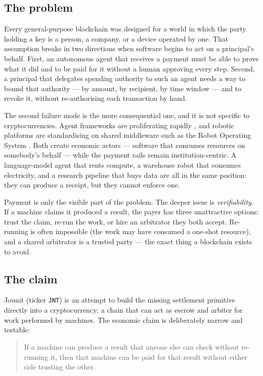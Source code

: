 \documentclass{article}
\begin{document}
\subsection{The problem}

Every general-purpose blockchain was designed for a world in which the party
holding a key is a person, a company, or a device operated by one. That
assumption breaks in two directions when software begins to act on a principal's
behalf. First, an autonomous agent that receives a payment must be able to prove
what it did and to be paid for it without a human approving every step. Second,
a principal that delegates spending authority to such an agent needs a way to
bound that authority --- by amount, by recipient, by time window --- and to
revoke it, without re-authorising each transaction by hand.

The second failure mode is the more consequential one, and it is not specific to
cryptocurrencies. Agent frameworks are proliferating rapidly \cite{sutton2019bitter,
yao2023survey,wang2023autogpt,yang2024sweagent}, and robotic platforms are
standardising on shared middleware such as the Robot Operating System
\cite{quan2021ros}. Both create economic actors --- software that consumes
resources on somebody's behalf --- while the payment rails remain
institution-centric. A language-model agent that rents compute, a warehouse
robot that consumes electricity, and a research pipeline that buys data are all
in the same position: they can produce a receipt, but they cannot enforce one.

Payment is only the visible part of the problem. The deeper issue is
\emph{verifiability}. If a machine claims it produced a result, the payer has
three unattractive options: trust the claim, re-run the work, or hire an
arbitrator they both accept. Re-running is often impossible (the work may have
consumed a one-shot resource), and a shared arbitrator is a trusted party --- the
exact thing a blockchain exists to avoid.

\subsection{The claim}

Jounit (ticker \texttt{JNT}) is an attempt to build the missing settlement
primitive directly into a cryptocurrency: a chain that can act as escrow and
arbiter for work performed by machines. The economic claim is deliberately
narrow and testable:

\begin{quote}
If a machine can produce a result that anyone else can check without re-running
it, then that machine can be paid for that result without either side trusting
the other.
\end{quote}
\end{document}
